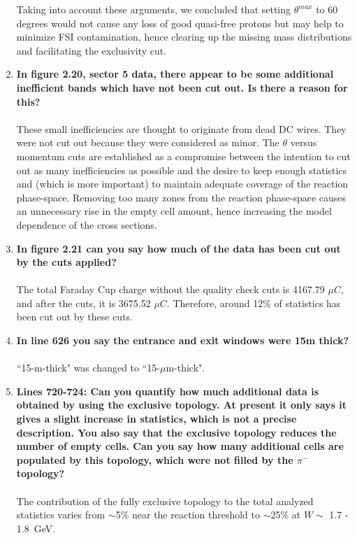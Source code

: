\documentclass[,superscriptaddress,showpacs,amssymb,amsmath,amsfonts,linenumbers,article]{revtex4-1}
\begin{document}
\begin{enumerate}[label=\textbf{\arabic*}.]
Taking into account these arguments, we concluded that setting $\theta^{max}$ to 60 degrees would not cause any loss of good quasi-free protons but may help to minimize FSI contamination, hence clearing up the missing mass distributions and facilitating the exclusivity cut.

\item {\bf In figure 2.20, sector 5 data, there appear to be some additional inefficient bands which have not been cut out. Is there a reason for this?}\\ \\
These small inefficiencies are thought to originate from dead DC wires. They were not cut out because they were considered as minor. The $\theta$ versus momentum cuts are established as a compromise between the intention to cut out as many inefficiencies as possible and the desire to keep enough statistics and (which is more important) to maintain adequate coverage of the reaction phase-space. Removing too many zones from the reaction phase-space causes an unnecessary rise in the empty cell amount, hence increasing the model dependence of the cross sections.%

\item {\bf In figure 2.21 can you say how much of the data has been cut out by the cuts applied?}\\ \\
The total Faraday Cup charge without the quality check cuts is 4167.79 $\mu C$, and after the cuts, it is 3675.52 $\mu C$. Therefore, around 12\% of statistics has been cut out by these cuts.

\item {\bf In line 626 you say the entrance and exit windows were 15m thick?}\\ \\
``15-m-thick" was changed to ``15-$\mu$m-thick".

\item {\bf Lines 720-724: Can you quantify how much additional data is obtained by using the exclusive topology. At present it only says it gives a slight increase in statistics, which is not a precise description. You also say that the exclusive topology reduces the number of empty cells. Can you say how many additional cells are populated by this topology, which were not filled by the $\pi^{-}$ topology?}\\ \\
The contribution of the fully exclusive topology to the total analyzed statistics varies from $\sim$5\% near the reaction threshold to $\sim$25\% at $W \sim$ 1.7 - 1.8~GeV.


\end{enumerate}
\end{document}

